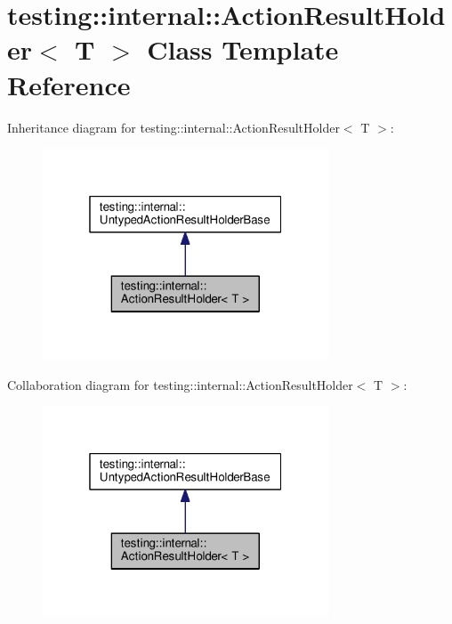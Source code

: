 \hypertarget{classtesting_1_1internal_1_1ActionResultHolder}{}\section{testing\+:\+:internal\+:\+:Action\+Result\+Holder$<$ T $>$ Class Template Reference}
\label{classtesting_1_1internal_1_1ActionResultHolder}


Inheritance diagram for testing\+:\+:internal\+:\+:Action\+Result\+Holder$<$ T $>$\+:\nopagebreak
\begin{figure}[H]
\begin{center}
\leavevmode
\includegraphics[width=241pt]{classtesting_1_1internal_1_1ActionResultHolder__inherit__graph}
\end{center}
\end{figure}


Collaboration diagram for testing\+:\+:internal\+:\+:Action\+Result\+Holder$<$ T $>$\+:\nopagebreak
\begin{figure}[H]
\begin{center}
\leavevmode
\includegraphics[width=241pt]{classtesting_1_1internal_1_1ActionResultHolder__coll__graph}
\end{center}
\end{figure}
